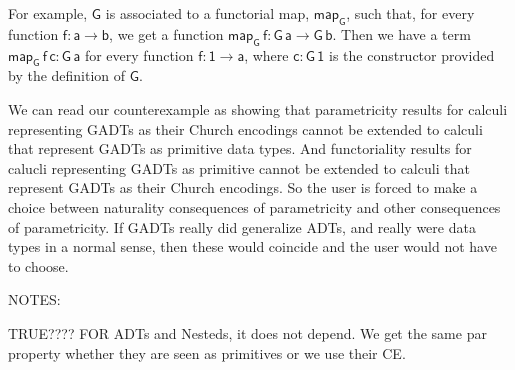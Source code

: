 \documentclass[acmsmall,screen,review,anonymous]{acmart}
\theoremstyle{definition}
\newcommand{\map}{\mathsf{map}}
\begin{document}
For example, $\mathsf{G}$ is associated to a functorial map,
$\map_{\mathsf{G}}$, such that, for every function $\mathsf{f : a \to
  b}$, we get a function $\map_{\mathsf{G}}\,\mathsf{f} : \mathsf{G\,a
  \to G\,b}$.  Then we have a term $\map_{\mathsf{G}}\,\mathsf{f\,c} :
\mathsf{G\,a}$ for every function $\mathsf{f : \mathsf{1} \to a}$,
where $\mathsf{c : G\,\mathsf{1}}$ is the constructor provided by the
definition of $\mathsf{G}$.


We can read our counterexample as showing that parametricity results
for calculi representing GADTs as their Church encodings cannot be
extended to calculi that represent GADTs as primitive data types. And
functoriality results for calucli representing GADTs as primitive
cannot be extended to calculi that represent GADTs as their Church
encodings.  So the user is forced to make a choice between naturality
consequences of parametricity and other consequences of
parametricity. If GADTs really did generalize ADTs, and really were
data types in a normal sense, then these would coincide and the user
would not have to choose.


\begin{comment}
{\color{violet} This is already in the paper, split in multiple places.}
An analysis of the Eq A B type in Bob's systems shows that the set
interpretation is empty whenever the A and B have different set
interpretations.  Likewise, its relational interpretation is the empty
relation whenever the A and B have different relational
interpretations (even when the underlying set interpretations are the
same).  The consequences of parametricity are thus immediate: there
can be no term of type Eq A B if A and B are different types.
Moreover, this behavior is fundamentally non-functorial, so that there
is no hope of defining a map for Eq.  In particular, that means we
cannot expect to retrieve non-trivial naturality properties for the Eq
type, despite these are usually considered to be a special case of
parametricity properties.  Indeed, the common understanding that
parametricity generalizes naturality only makes sense for functorial
types.  We can specialize these considerations to the type Eq 1 B,
representing G, our example GADT defined by a unique constructor c ::
G 1.
\end{comment}

\vspace*{1in}

NOTES:

{\color{violet} TRUE????}
FOR ADTs and Nesteds, it does not depend. We get the same par property
whether they are seen as primitives or we use their CE.
\end{document}
